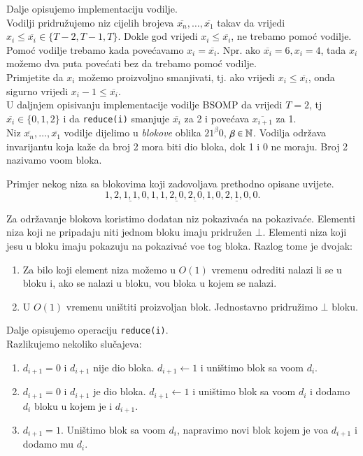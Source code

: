 Dalje opisujemo implementaciju vodilje.\\
Vodilji pridru\v{z}ujemo niz cijelih brojeva $\overline{x_{n}},\dotsc,\overline{x_{1}}$ takav da vrijedi $x_{i} \le \overline{x_{i}} \in \{T-2,T-1,T\}$.
Dokle god vrijedi $x_{i} \le \overline{x_{i}}$, ne trebamo pomo\'{c} vodilje.
Pomo\'{c} vodilje trebamo kada pove\'{c}avamo $x_{i} = \overline{x_{i}}$.
Npr. ako $\overline{x_{i}} = 6, x_{i} = 4$, tada $x_{i}$ mo\v{z}emo dva puta pove\'{c}ati bez da trebamo pomo\'{c} vodilje.\\
Primjetite da $x_{i}$ mo\v{z}emo proizvoljno smanjivati, tj. ako vrijedi $x_{i} \le \overline{x_{i}}$, onda sigurno vrijedi $x_{i} - 1 \le \overline{x_{i}}$.\\
U daljnjem opisivanju implementacije vodilje BSOMP da vrijedi $T = 2$, tj $\overline{x_{i}} \in \{0,1,2\}$ i da \texttt{reduce(i)} smanjuje $\overline{x_{i}}$ za 2 i pove\'{c}ava $\overline{x_{i+1}}$ za 1.\\
Niz $\overline{x_{n}},\dotsc,\overline{x_{1}}$ vodilje dijelimo u \emph{blokove} oblika $21^{\beta}0$, $\beta \in \mathbb{N}$.
Vodilja odr\v{z}ava invarijantu koja ka\v{z}e da broj 2 mora biti dio bloka, dok 1 i 0 ne moraju.
Broj 2 nazivamo vo\dj om bloka.
\begin{exa}
  Primjer nekog niza sa blokovima koji zadovoljava prethodno opisane uvijete.
  $$
  1,\underline{2,1,1,0},1,1,\underline{2,0},\underline{2,0},1,0,\underline{2,1,0},0.
  $$
\end{exa}
Za odr\v{z}avanje blokova koristimo dodatan niz pokaziva\'{c}a na pokaziva\'{c}e.
Elementi niza koji ne pripadaju niti jednom bloku imaju pridru\v{z}en $\bot$.
Elementi niza koji jesu u bloku imaju pokazuju na pokaziva\'{c} vo\dj e tog bloka.
Razlog tome je dvojak:
\begin{enumerate}
  \item Za bilo koji element niza mo\v{z}emo u $O(1)$ vremenu odrediti nalazi li se u bloku i, ako se nalazi u bloku, vo\dj u bloka u kojem se nalazi.
  \item U $O(1)$ vremenu uni\v{s}titi proizvoljan blok. Jednostavno pridru\v{z}imo $\bot$ bloku.
\end{enumerate}

Dalje opisujemo operaciju \texttt{reduce(i)}.\\
Razlikujemo nekoliko slu\v{c}ajeva:
\begin{enumerate}
  \item $d_{i+1} = 0$ i $d_{i+1}$ nije dio bloka. $d_{i+1} \leftarrow 1$ i uni\v{s}timo blok sa vo\dj om $d_{i}$.
  \item $d_{i+1} = 0$ i $d_{i+1}$ je dio bloka. $d_{i+1} \leftarrow 1$ i uni\v{s}timo blok sa vo\dj om $d_{i}$ i dodamo $d_{i}$ bloku u kojem je i $d_{i+1}$.
  \item $d_{i+1} = 1$. Uni\v{s}timo blok sa vo\dj om $d_{i}$, napravimo novi blok kojem je vo\dj a $d_{i+1}$ i dodamo mu $d_{i}$.
\end{enumerate}

